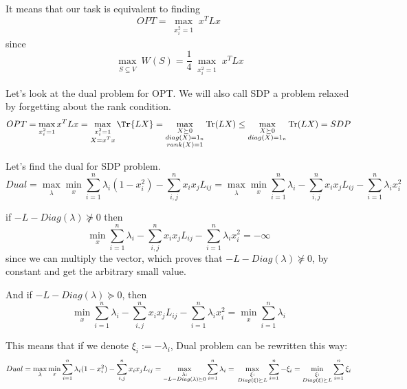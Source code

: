 \documentclass{article}
\DeclareMathOperator{\tr}{Tr}
\begin{document}
It means that our task is equivalent to finding $$OPT = \max_{\substack{x_i^2 = 1}} x^T L x$$ since $$\max_{\substack{S \subseteq V}} W(S) = \frac{1}{4} \max_{\substack{x_i^2 = 1}} x^T L x$$

Let's look at the dual problem for OPT. We will also call SDP a problem relaxed by forgetting about the rank condition.$$OPT = \max_{\substack{x_i^2 = 1}} x^T L x = \max_{\substack{x_i^2 = 1 \\ X = x^T x}} \Tr{LX} = \max_{\substack{X \succeq 0 \\ diag(X) = 1_n \\ rank(X) = 1}} \tr (L X) \leq \max_{\substack{X \succeq 0 \\ diag(X) = 1_n}} \tr (L X) = SDP$$

Let's find the dual for SDP problem. 
$$Dual = \max_{\substack{\lambda}} \min_{\substack{x}} \sum_{i=1}^n{\lambda_i (1  - x_{i}^2)} - \sum_{i, j}^n{x_{i}x_{j} L_{ij}} = \max_{\substack{\lambda}} \min_{\substack{x}} \sum_{i=1}^n{\lambda_i} - \sum_{i, j}^n{x_{i}x_{j} L_{ij}} - \sum_{i=1}^n{\lambda_i x_{i}^2}$$

if $-L - Diag(\lambda) \not \succeq 0$ then $$\min_{\substack{x}}  \sum_{i=1}^n{\lambda_i} - \sum_{i, j}^n{x_{i}x_{j} L_{ij}} - \sum_{i=1}^n{\lambda_i x_{i}^2} = -\infty$$ since we can multiply the vector, which proves that $-L - Diag(\lambda) \not \succeq 0$, by constant and get the arbitrary small value. 

And if $-L - Diag(\lambda) \succeq 0$, then  $$\min_{\substack{x}}  \sum_{i=1}^n{\lambda_i} - \sum_{i, j}^n{x_{i}x_{j} L_{ij}} - \sum_{i=1}^n{\lambda_i x_{i}^2} = \min_{\substack{x}} \sum_{i=1}^n{\lambda_i}$$

This means that if we denote $\xi_i := -\lambda_i$, Dual problem can be rewritten this way: $$Dual = \max_{\substack{\lambda}} \min_{\substack{x}} \sum_{i=1}^n{\lambda_i (1  - x_{i}^2)} - \sum_{i, j}^n{x_{i}x_{j} L_{ij}} = \max_{\substack{\lambda: \\ -L - Diag(\lambda) \succeq 0}} \sum_{i=1}^n{\lambda_i} = \\ \max_{\substack{\xi: \\  Diag(\xi) \succeq L}} \sum_{i=1}^n{-\xi_i} =  \min_{\substack{\xi: \\  Diag(\xi) \succeq L}} \sum_{i=1}^n{\xi_i}$$
\end{document}

